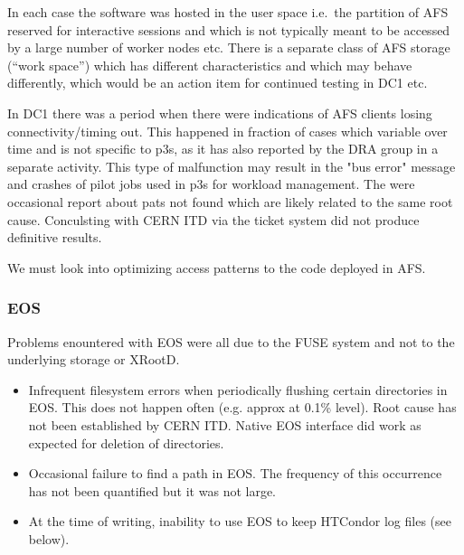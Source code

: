 \documentclass[pdftex,12pt,letter]{article}
\begin{document}
\noindent In each case the software was hosted in the user space i.e.~the partition of AFS reserved for interactive sessions
and which is not typically meant to be accessed by a large number of worker nodes etc. There is a separate class
of AFS storage (``work space'') which has different characteristics and which may behave differently, which would
be an action item for continued testing in DC1 etc.

In DC1 there was a period when there were indications of AFS clients losing connectivity/timing out.
This happened in fraction of cases which variable over time and is not specific to p3s, as it has also reported
by the DRA group in a separate activity. This type of malfunction may result in the "bus error" message and crashes of
pilot jobs used in p3s for workload management. The were occasional report about pats not found which are likely
related to the same root cause. Conculsting with CERN ITD via the ticket system did not produce definitive results.

We must look into optimizing access patterns to the code deployed in AFS.

\subsubsection{EOS}
Problems enountered with EOS were all due to the FUSE system and not to the underlying storage or XRootD.

\begin{itemize}

\item Infrequent filesystem errors when periodically flushing certain directories in EOS. This does not happen often (e.g. approx at 0.1\% level).
Root cause has not been established by CERN ITD. Native EOS interface did work as expected for deletion of directories.

\item Occasional failure to find a path in EOS. The frequency of this occurrence has not been quantified but it was not large.

\item At the time of writing, inability to use EOS to keep HTCondor log files (see below).

\end{itemize}
\end{document}

